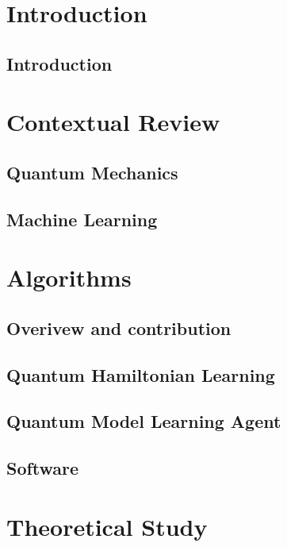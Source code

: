 
\part*{Introduction}\label{part:intro}
    \chapter{Introduction}\label{chapter:intro}
        

\part{Contextual Review}\label{part:contextual_review}
    \chapter{Quantum Mechanics}\label{chapter:qm}
        
    \chapter{Machine Learning}\label{chapter:ml}
        

\part{Algorithms}\label{part:algorithms}
    \chapter*{Overivew and contribution}
        
    \chapter{Quantum Hamiltonian Learning}\label{chapter:qhl}
        
    \chapter{Quantum Model Learning Agent}\label{chapter:qmla}
        
    \chapter{Software}\label{chapter:sw}
        

\part{Theoretical Study}\label{part:theoretical_study}
